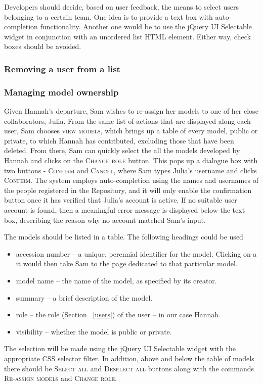 \begin{techNote}
Developers should decide, based on user feedback, the means to select users belonging to a certain team. One idea is to provide a text box with auto-completion functionality. Another one would be to use the jQuery UI Selectable widget in conjunction with an unordered list HTML element. Either way, check boxes should be avoided.
\end{techNote}

\subsubsection{Removing a user from a list}

\subsubsection{Managing model ownership}
Given Hannah's departure, Sam wishes to re-assign her models to one of her close collaborators, Julia. From the same list of actions that are displayed along each user, Sam chooses \textsc{view models}, which brings up a table of every model, public or private, to which Hannah has contributed, excluding those that have been deleted. From there, Sam can quickly select the all the models developed by Hannah and clicks on the \textsc{Change role} button. This pops up a dialogue box with two buttons - \textsc{Confirm} and \textsc{Cancel}, where Sam types Julia's username and clicks \textsc{Confirm}. The system employs auto-completion using the names and usernames of the people registered in the Repository, and it will only enable the confirmation button once it has verified that Julia's account is active. If no suitable user account is found, then a meaningful error message is displayed below the text box, describing the reason why no account matched Sam's input. 

\begin{techNote}
The models should be listed in a table. The following headings could be used
\begin{itemize}
\item accession number -- a unique, perennial identifier for the model. Clicking on a it would then take Sam to the page dedicated to that particular model. 
\item model name -- the name of the model, as specified by its creator.
\item summary -- a brief description of the model.
\item role -- the role (Section ~\ref{users}) of the user -- in our case Hannah. 
\item visibility -- whether the model is public or private. 
\end{itemize}
The selection will be made  using the jQuery UI Selectable widget with the appropriate CSS selector filter. In addition, above and below the table of models there should be \textsc{Select all} and \textsc{Deselect all} buttons along with the commands \textsc{Re-assign models} and \textsc{Change role}.
\end{techNote}

